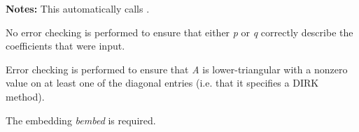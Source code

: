 \documentclass[letterpaper,10pt,english]{sphinxmanual}
\begin{document}
\begin{fulllineitems}
\begin{description}
\begin{itemize}
\end{itemize}

\end{description}

\textbf{Notes:} This automatically calls {\hyperref[c_interface/User_callable:c.ARKodeSetImplicit]{\emph{}}}.

No error checking is performed to ensure that either \emph{p} or \emph{q}
correctly describe the coefficients that were input.

Error checking is performed to ensure that \emph{A} is
lower-triangular with a nonzero value on at least one of the
diagonal entries (i.e. that it specifies a DIRK method).

The embedding \emph{bembed} is required.

\end{fulllineitems}

\end{document}
